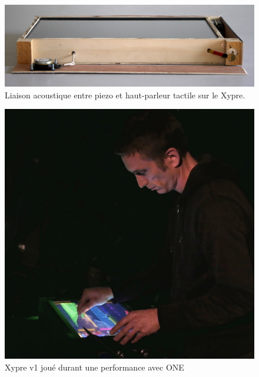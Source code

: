 \begin{figure}[!htbp]
	\captionsetup{format=plain}%
	\includegraphics[width=\textwidth]{gfx/05_interfaces/Xypre_FrontPanel_144dpi.jpg}
	\caption[Liaison acoustique entre piezo et haut-parleur tactile sur le Xypre]{Liaison acoustique entre piezo et haut-parleur tactile sur le Xypre.}
	\label{fig:interface:xypre_v2-hppiezo}
\end{figure}


\begin{figure}[!htbp]
	\captionsetup{format=plain}%
	\includegraphics[width=\textwidth]{gfx/05_interfaces/xypre-v1_72dpi.jpg}
	\caption{Xypre v1 joué durant une performance avec ONE}
	\label{fig:interface:xyprev1_jeu}
\end{figure}


